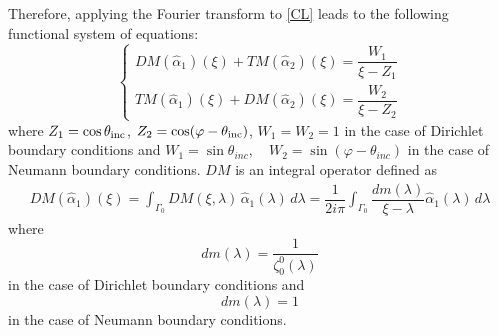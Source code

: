 Therefore, applying the Fourier transform to \eqref{CL} leads to the following functional system of equations:
\begin{equation}
\label{functional_eq}
\begin{cases}
DM(\hat{\alpha}_1)(\xi) + TM(\hat{\alpha}_2)(\xi) = \dfrac{W_1}{\xi - Z_1} \\
TM(\hat{\alpha}_1)(\xi) + DM(\hat{\alpha}_2)(\xi)  = \dfrac{W_2}{\xi - Z_2} 
\end{cases}
\end{equation}
where $Z_1 =  \cos \theta_{\rm inc}$, $Z_2 =  \cos (\varphi - \theta_{\rm inc})$, $W_1=W_2=1$ in the case of Dirichlet boundary conditions and $W_1=\sin\theta_{inc}, \quad W_2=\sin(\varphi-\theta_{inc})$ in the case of Neumann boundary conditions. $DM$ is an integral operator defined as
\begin{equation}
\label{DM_operator}
\begin{split}
DM(\hat{\alpha}_1)(\xi) = \int_{\Gamma_0} DM(\xi,\lambda) \, \hat{\alpha}_1(\lambda) \, d \lambda =\dfrac{1}{2i\pi} \int_{\Gamma_0} \dfrac{dm(\lambda)  }{\xi - \lambda} \hat{\alpha}_1(\lambda) \, d\lambda
\end{split}
\end{equation}
where 
\begin{equation}
\label{dmDir}
dm(\lambda) = \dfrac{1}{\zeta_0^0(\lambda)}
\end{equation}
in the case of Dirichlet boundary conditions and 
\begin{equation}
\label{dmDir}
dm(\lambda)=1
\end{equation}
in the case of Neumann boundary conditions. 

